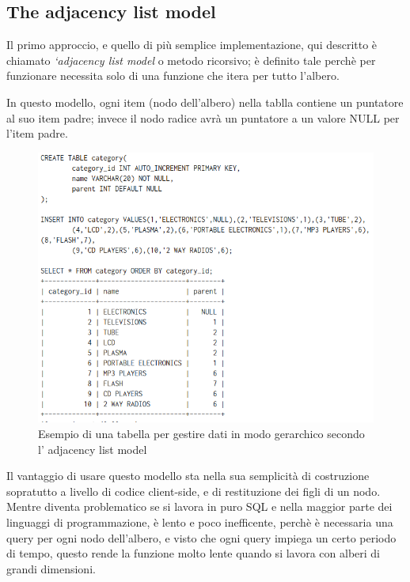\subsection{The adjacency list model}
Il primo approccio, e quello di più semplice implementazione, qui descritto è chiamato \textit{‘adjacency list model} o metodo ricorsivo;
è definito tale perchè per funzionare necessita solo di una funzione che itera per tutto l'albero.

In questo modello, ogni item (nodo dell'albero) nella tablla contiene un puntatore al suo item padre; invece il nodo radice avrà un puntatore a un valore
NULL per l'item padre.

\begin{figure}[ht!]
    \centering
	\includegraphics[scale=0.75]{images/Adjacency_list_model_table.PNG}
	\caption{Esempio di una tabella per gestire dati in modo gerarchico secondo l' adjacency list model }
\end{figure}
 
Il vantaggio di usare questo modello sta nella sua semplicità di costruzione sopratutto a livello di codice client-side, 
e di restituzione dei figli di un nodo. Mentre diventa problematico se si lavora in puro SQL e nella maggior parte dei linguaggi di 
programmazione, è lento e poco inefficente, perchè è necessaria una query per ogni nodo dell'albero, e visto che ogni query impiega 
un certo periodo di tempo, questo rende la funzione molto lente quando si lavora con alberi di grandi dimensioni.

\newpage


